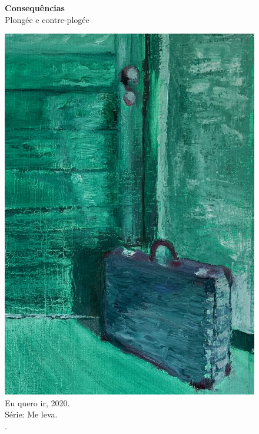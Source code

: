 \begin{figure}
  \caption[Consequências: Plogée e contre-plongée]{\textbf{Consequências} \\ Plongée e contre-plogée}
  \begin{minipage}[b]{.4\linewidth}
    \includegraphics[width = \linewidth]{apendice/pinturas-finalizadas/boudet-eu-quero-ir.pdf}
    \caption*{Eu quero ir, 2020. \\ Série: Me leva. \\ \oleolinho. \\ }
  \end{minipage}
  \hfill
  \begin{minipage}[b]{.4\linewidth}

\end{minipage}
\end{figure}

